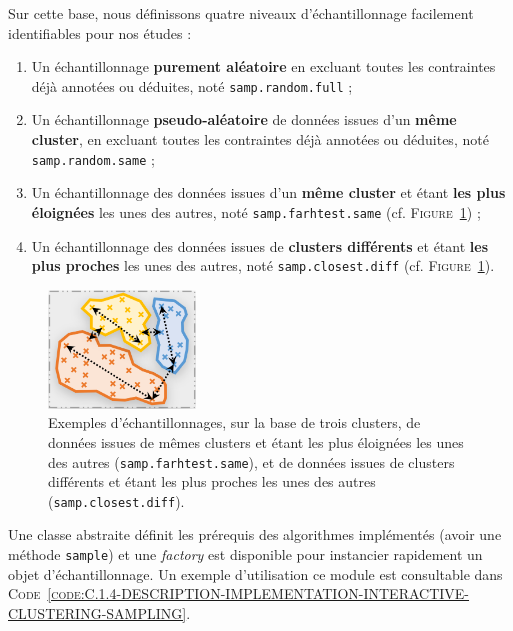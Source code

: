 	Sur cette base, nous définissons quatre niveaux d'échantillonnage facilement identifiables pour nos études :
	\begin{enumerate}
		\item Un échantillonnage \textbf{purement aléatoire} en excluant toutes les contraintes déjà annotées ou déduites, noté \texttt{samp.random.full} ;
		\item Un échantillonnage \textbf{pseudo-aléatoire} de données issues d'un \textbf{même cluster}, en excluant toutes les contraintes déjà annotées ou déduites, noté \texttt{samp.random.same} ;
		\item Un échantillonnage des données issues d'un \textbf{même cluster} et étant \textbf{les plus éloignées} les unes des autres, noté \texttt{samp.farhtest.same} (cf. \textsc{Figure~\ref{figure:C.1.4-DESCRIPTION-IMPLEMENTATION-INTERACTIVE-CLUSTERING-CONTRAINTES-SAMPLING}}) ;
		\item Un échantillonnage des données issues de \textbf{clusters différents} et étant \textbf{les plus proches} les unes des autres, noté \texttt{samp.closest.diff} (cf. \textsc{Figure~\ref{figure:C.1.4-DESCRIPTION-IMPLEMENTATION-INTERACTIVE-CLUSTERING-CONTRAINTES-SAMPLING}}).
	\end{enumerate}
	
	\begin{figure}[!htb]
		\centering
		\includegraphics[width=0.35\textwidth]{figures/example-sampling}
		\caption{
			Exemples d'échantillonnages, sur la base de trois clusters, de données issues de mêmes clusters et étant les plus éloignées les unes des autres (\texttt{samp.farhtest.same}), et de données issues de clusters différents et étant les plus proches les unes des autres (\texttt{samp.closest.diff}).
		}
		\label{figure:C.1.4-DESCRIPTION-IMPLEMENTATION-INTERACTIVE-CLUSTERING-CONTRAINTES-SAMPLING}
	\end{figure}

	Une classe abstraite définit les prérequis des algorithmes implémentés (avoir une méthode \texttt{sample}) et une \textit{factory} est disponible pour instancier rapidement un objet d'échantillonnage.
	Un exemple d'utilisation ce module est consultable dans \textsc{Code~\ref{code:C.1.4-DESCRIPTION-IMPLEMENTATION-INTERACTIVE-CLUSTERING-SAMPLING}}.
	

